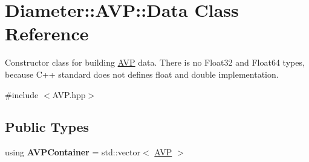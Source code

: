 \hypertarget{classDiameter_1_1AVP_1_1Data}{}\section{Diameter\+:\+:A\+VP\+:\+:Data Class Reference}
\label{classDiameter_1_1AVP_1_1Data}


Constructor class for building \hyperlink{classDiameter_1_1AVP}{A\+VP} data. There is no Float32 and Float64 types, because C++ standard does not defines {\ttfamily float} and {\ttfamily double} implementation.  




{\ttfamily \#include $<$A\+V\+P.\+hpp$>$}

\subsection*{Public Types}
\begin{DoxyCompactItemize}
\item 
\mbox{\label{classDiameter_1_1AVP_1_1Data_abde6c04fc27410e0731bcda256c480f1}} 
using {\bfseries A\+V\+P\+Container} = std\+::vector$<$ \hyperlink{classDiameter_1_1AVP}{A\+VP} $>$
\end{DoxyCompactItemize}
